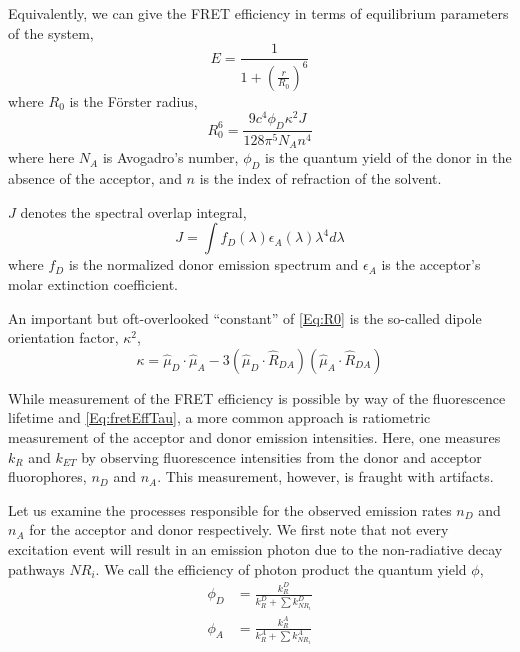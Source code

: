 \documentclass{article}
\newcommand{\NR}{\ensuremath{\mathit{NR}}}          %
\newcommand{\ET}{\ensuremath{\mathit{ET}}}          %
\begin{document}
Equivalently, we can give the FRET efficiency in terms of equilibrium
parameters of the system,
\begin{equation}
  E = \frac{1}{1 + \left( \frac{r}{R_0} \right)^6}
  \label{Eq:fretEff}
\end{equation}
where $R_0$ is the F\"orster radius,
\begin{equation}
  R_0^6 = \frac{9 c^4 \phi_D \kappa^2 J}{128 \pi^5 N_A n^4}
  \label{Eq:R0}
\end{equation}
where here $N_A$ is Avogadro's number, $\phi_D$ is the quantum yield of the
donor in the absence of the acceptor, and $n$ is the index of
refraction of the solvent.

$J$ denotes the spectral overlap integral,
\[ J = \int f_D(\lambda) \epsilon_A(\lambda) \lambda^4 d\lambda \]
where $f_D$ is the normalized donor emission spectrum and $\epsilon_A$
is the acceptor's molar extinction coefficient.

An important but oft-overlooked ``constant'' of \eqref{Eq:R0} is
the so-called dipole orientation factor, $\kappa^2$,
\begin{equation}
  \kappa = \hat\mu_D \cdot \hat\mu_A - 3(\hat\mu_D \cdot \hat R_{DA}) (\hat\mu_A \cdot \hat R_{DA})
  \label{Eq:kappa}
\end{equation}

While measurement of the FRET efficiency is possible by way of the
fluorescence lifetime and \eqref{Eq:fretEffTau}, a more common
approach is ratiometric measurement of the acceptor and donor emission
intensities\cite{Dahan1999}. Here, one measures $k_R$ and $k_\ET$ by observing
fluorescence intensities from the donor and acceptor fluorophores,
$n_D$ and $n_A$. This measurement, however, is fraught with
artifacts.

Let us examine the processes responsible for the observed emission rates
$n_D$ and $n_A$ for the acceptor and donor respectively. We first note
that not every excitation event will result in an emission photon due
to the non-radiative decay pathways $\NR_i$. We call the efficiency of
photon product the quantum yield $\phi$,
\begin{align*}
  \phi_D & = \frac{k^D_R}{k^D_R + \sum k^D_{\NR_i}} \\
  \phi_A & = \frac{k^A_R}{k^A_R + \sum k^A_{\NR_i}} \\
\end{align*}
\end{document}
